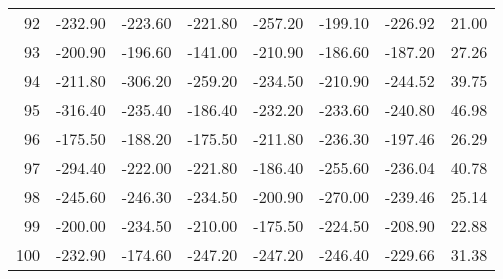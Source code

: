 \begin{longtable}{rrrrrrrr}
92 & -232.90 & -223.60 & -221.80 & -257.20 & -199.10 & -226.92 & 21.00  \\
93 & -200.90 & -196.60 & -141.00 & -210.90 & -186.60 & -187.20 & 27.26  \\
94 & -211.80 & -306.20 & -259.20 & -234.50 & -210.90 & -244.52 & 39.75  \\
95 & -316.40 & -235.40 & -186.40 & -232.20 & -233.60 & -240.80 & 46.98  \\
96 & -175.50 & -188.20 & -175.50 & -211.80 & -236.30 & -197.46 & 26.29  \\
97 & -294.40 & -222.00 & -221.80 & -186.40 & -255.60 & -236.04 & 40.78  \\
98 & -245.60 & -246.30 & -234.50 & -200.90 & -270.00 & -239.46 & 25.14  \\
99 & -200.00 & -234.50 & -210.00 & -175.50 & -224.50 & -208.90 & 22.88  \\
100 & -232.90 & -174.60 & -247.20 & -247.20 & -246.40 & -229.66 & 31.38  \\

\end{longtable}


